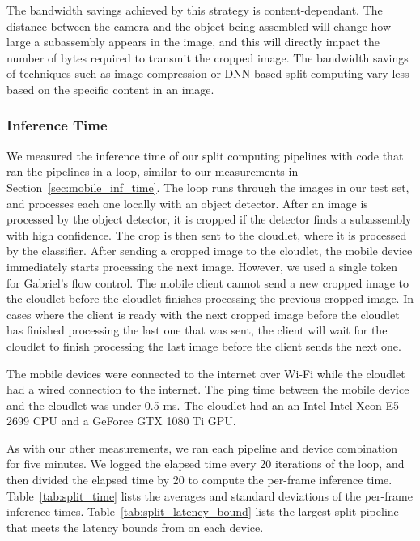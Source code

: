 The bandwidth savings achieved by this strategy is content-dependant.
The distance between the camera and the object being assembled will change how
large a subassembly appears in the image, and this will directly impact the
number of bytes required to transmit the cropped image.
The bandwidth savings of techniques such as image compression or DNN-based split
computing vary less based on the specific content in an image.

\subsubsection{Inference Time}

We measured the inference time of our split computing pipelines with code that
ran the pipelines in a loop, similar to our measurements in
Section~\ref{sec:mobile_inf_time}.
The loop runs through the images in our test set, and processes each one locally
with an object detector.
After an image is processed by the object detector, it is cropped if the
detector finds a subassembly with high confidence.
The crop is then sent to the cloudlet, where it is processed by the classifier.
After sending a cropped image to the cloudlet, the mobile device immediately
starts processing the next image.
However, we used a single token for Gabriel's flow control.
The mobile client cannot send a new cropped image to the cloudlet before the
cloudlet finishes processing the previous cropped image.
In cases where the client is ready with the next cropped image before the
cloudlet has finished processing the last one that was sent, the client will
wait for the cloudlet to finish processing the last image before the client
sends the next one.

The mobile devices were connected to the internet over Wi-Fi while the cloudlet
had a wired connection to the internet.
The ping time between the mobile device and the cloudlet was under 0.5 ms.
The cloudlet had an an Intel Intel Xeon E5–2699 CPU and a GeForce GTX 1080 Ti
GPU.

As with our other measurements, we ran each pipeline and device combination for
five minutes.
We logged the elapsed time every 20 iterations of the loop, and then divided the
elapsed time by 20 to compute the per-frame inference time.
Table~\ref{tab:split_time} lists the averages and standard deviations of the
per-frame inference times.
Table~\ref{tab:split_latency_bound} lists the largest split pipeline that meets
the latency bounds from \citet{chen2017} on each device.

